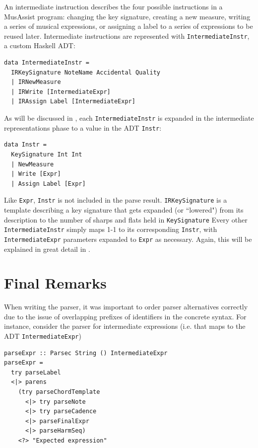 \documentclass{report}
\begin{document}
An intermediate instruction describes the four possible instructions in a MusAssist program: changing the key signature, creating a new measure, writing a series of musical expressions, or assigning a label to a series of expressions to be reused later. Intermediate instructions are represented with \verb.IntermediateInstr., a custom Haskell ADT:

\begin{verbatim}
data IntermediateInstr = 
  IRKeySignature NoteName Accidental Quality
  | IRNewMeasure
  | IRWrite [IntermediateExpr]
  | IRAssign Label [IntermediateExpr]
\end{verbatim}

As will be discussed in , each \verb.IntermediateInstr. is expanded in the intermediate representations phase to a value in the ADT \verb.Instr.:

\begin{verbatim}
data Instr = 
  KeySignature Int Int 
  | NewMeasure 
  | Write [Expr]
  | Assign Label [Expr] 
\end{verbatim}

Like \verb.Expr., \verb.Instr. is not included in the parse result. \verb.IRKeySignature. is a template describing a key signature that gets expanded (or ``lowered") from its description to the number of sharps and flats held in \verb.KeySignature. Every other \verb.IntermediateInstr. simply maps 1-1 to its corresponding \verb.Instr., with \verb.IntermediateExpr. parameters expanded to \verb.Expr. as necessary. Again, this will be explained in great detail in .

\section{Final Remarks}
\label{sec:finalremarks}

When writing the parser, it was important to order parser alternatives correctly due to the issue of overlapping prefixes of identifiers in the concrete syntax. For instance, consider the parser for intermediate expressions (i.e. that maps to the ADT \verb.IntermediateExpr.)

\begin{verbatim}
parseExpr :: Parsec String () IntermediateExpr
parseExpr = 
  try parseLabel
  <|> parens 
    (try parseChordTemplate 
      <|> try parseNote
      <|> try parseCadence
      <|> parseFinalExpr
      <|> parseHarmSeq)
    <?> "Expected expression"
\end{verbatim}
\end{document}
